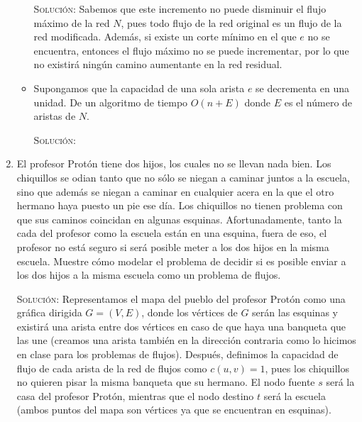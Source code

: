 \documentclass[letterpaper,11pt]{article}
\begin{document}
\begin{enumerate}
\begin{itemize}
        \textsc{Solución}: Sabemos que este incremento no puede disminuir el 
        flujo máximo de la red $N$, pues todo flujo de la red original es un 
        flujo de la red modificada. Además, si existe un corte mínimo en el que 
        $e$ no se encuentra, entonces el flujo máximo no se puede incrementar, 
        por lo que no existirá ningún camino aumentante en la red residual.

        \item Supongamos que la capacidad de una sola arista $e$ se decrementa
        en una unidad. De un algoritmo de tiempo $O(n + E)$ donde $E$ es el 
        número de aristas de $N$.

        \textsc{Solución:}
    \end{itemize}

    \item El profesor Protón tiene dos hijos, los cuales no se llevan nada 
    bien. Los chiquillos se odian tanto que no sólo se niegan a caminar juntos
    a la escuela, sino que además se niegan a caminar en cualquier acera en la 
    que el otro hermano haya puesto un pie ese día. Los chiquillos no tienen 
    problema con que sus caminos coincidan en algunas esquinas. Afortunadamente,
    tanto la cada del profesor como la escuela están en una esquina, fuera de 
    eso, el profesor no está seguro si será posible meter a los dos hijos en 
    la misma escuela. Muestre cómo modelar el problema de decidir si es posible 
    enviar a los dos hijos a la misma escuela como un problema de flujos.
    
    \textsc{Solución:} Representamos el mapa del pueblo del profesor Protón como 
    una gráfica dirigida $G = (V, E)$, donde los vértices de $G$ serán las 
    esquinas y existirá una arista entre dos vértices en caso de que haya una 
    banqueta que las une (creamos una arista también en la dirección contraria 
    como lo hicimos en clase para los problemas de flujos). Después, definimos 
    la capacidad de flujo de cada arista de la red de flujos como $c(u,v) = 1$, 
    pues los chiquillos no quieren pisar la misma banqueta que su hermano. El
    nodo fuente $s$ será la casa del profesor Protón, mientras que el nodo 
    destino $t$ será la escuela (ambos puntos del mapa son vértices ya que se 
    encuentran en esquinas). 


\end{enumerate}
\end{document}
